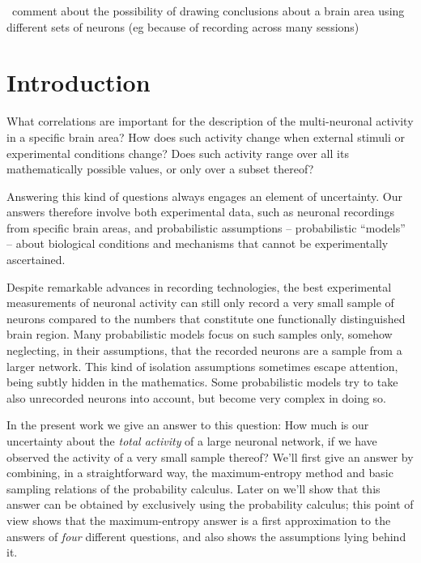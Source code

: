 \documentclass[\ifafour a4paper,12pt,\else a5paper,10pt,\fi%
onecolumn,oneside,article,%
british%
]{memoir}
\theoremstyle{remark}
\theoremstyle{innote}
\renewcommand*{\|}{\nonscript\,\vert\nonscript\;\mathopen{}}
\newcommand*{\puzzle}{{\fontencoding{U}\fontfamily{fontawesometwo}\selectfont\symbol{225}}}
\newcommand{\mynote}[1]{ {\color{notecolour}\puzzle\ #1}}
\begin{document}

\mynote{comment about the possibility of drawing conclusions about a brain
  area using different sets of neurons (eg because of recording across many
  sessions)}


\section{Introduction}
\label{sec:intro}

What correlations are important for the description of the multi-neuronal
activity in a specific brain area? How does such activity change when
external stimuli or experimental conditions change? Does such activity
range over all its mathematically possible values, or only over a
subset thereof? 

Answering this kind of questions always engages an element of uncertainty.
Our answers therefore involve both experimental data, such as neuronal
recordings from specific brain areas, and probabilistic assumptions --
probabilistic \enquote{models} -- about biological conditions and
mechanisms that cannot be experimentally ascertained.

Despite remarkable advances in recording technologies, the best
experimental measurements of neuronal activity can still only record a very
small sample of neurons compared to the numbers that constitute one
functionally distinguished brain region. Many probabilistic models focus on
such samples only, somehow neglecting, in their assumptions, that the
recorded neurons are a sample from a larger network. This kind of isolation
assumptions sometimes escape attention, being subtly hidden in the
mathematics. Some probabilistic models try to take also unrecorded neurons
into account, but become very complex in doing so.

In the present work we give an answer to this question: How much is our
uncertainty about the \emph{total activity} of a large neuronal network, if
we have observed the activity of a very small sample thereof? We'll first
give an answer by combining, in a straightforward way, the maximum-entropy
method and basic sampling relations of the probability calculus. Later on
we'll show that this answer can be obtained by exclusively using the
probability calculus; this point of view shows that the maximum-entropy
answer is a first approximation to the answers of \emph{four} different
questions, and also shows the assumptions lying behind it.
\end{document}
